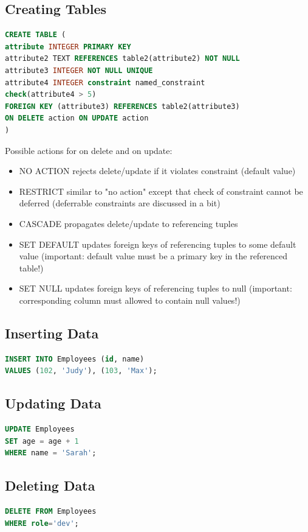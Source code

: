 \documentclass{article}
\begin{document}
\begin{multicols*}{2}
    \subsection*{Creating Tables}
    \begin{lstlisting}[language=SQL]
CREATE TABLE (
attribute INTEGER PRIMARY KEY
attribute2 TEXT REFERENCES table2(attribute2) NOT NULL
attribute3 INTEGER NOT NULL UNIQUE
attribute4 INTEGER constraint named_constraint
check(attribute4 > 5)
FOREIGN KEY (attribute3) REFERENCES table2(attribute3) 
ON DELETE action ON UPDATE action
)
    \end{lstlisting}
    Possible actions for on delete and on update:
    \begin{itemize}
        \item NO ACTION rejects delete/update if it violates constraint (default value)
        \item RESTRICT similar to "no action" except that check of constraint cannot be deferred
              (deferrable constraints are discussed in a bit)
        \item CASCADE propagates delete/update to referencing tuples
        \item SET DEFAULT updates foreign keys of referencing tuples to some default value
              (important: default value must be a primary key in the referenced table!)
        \item SET NULL updates foreign keys of referencing tuples to null
              (important: corresponding column must allowed to contain null values!)

    \end{itemize}
    \subsection*{Inserting Data}
    \begin{lstlisting}[language=SQL]
INSERT INTO Employees (id, name) 
VALUES (102, 'Judy'), (103, 'Max');
    \end{lstlisting}
    \subsection*{Updating Data}
    \begin{lstlisting}[language=SQL]
UPDATE Employees
SET age = age + 1
WHERE name = 'Sarah'; 
    \end{lstlisting}
    \subsection*{Deleting Data}
    \begin{lstlisting}[language=SQL]
DELETE FROM Employees 
WHERE role='dev';
    \end{lstlisting}

\end{multicols*}
\end{document}
